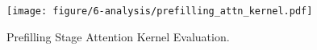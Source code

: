 \begin{figure}[t]
    \centering
    \texttt{[image: figure/6-analysis/prefilling\_attn\_kernel.pdf]}
    \caption{Prefilling Stage Attention Kernel Evaluation.} 
        
    \label{fig:ana:prefilling_attention}
\end{figure}
